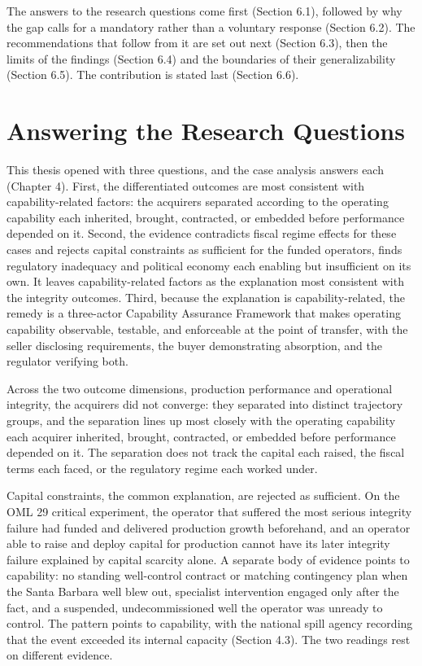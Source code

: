 \documentclass[twoside,fontset=lmodern]{mitthesis}
\begin{document}
The answers to the research questions come first (Section 6.1), followed
by why the gap calls for a mandatory rather than a voluntary response
(Section 6.2). The recommendations that follow from it are set out next
(Section 6.3), then the limits of the findings (Section 6.4) and the
boundaries of their generalizability (Section 6.5). The contribution is
stated last (Section 6.6).

\hypertarget{answering-the-research-questions}{%
\section{Answering the Research
Questions}\label{answering-the-research-questions}}

This thesis opened with three questions, and the case analysis answers
each (Chapter 4). First, the differentiated outcomes are most consistent
with capability-related factors: the acquirers separated according to
the operating capability each inherited, brought, contracted, or
embedded before performance depended on it. Second, the evidence
contradicts fiscal regime effects for these cases and rejects capital
constraints as sufficient for the funded operators, finds regulatory
inadequacy and political economy each enabling but insufficient on its
own. It leaves capability-related factors as the explanation most
consistent with the integrity outcomes. Third, because the explanation
is capability-related, the remedy is a three-actor Capability Assurance
Framework that makes operating capability observable, testable, and
enforceable at the point of transfer, with the seller disclosing
requirements, the buyer demonstrating absorption, and the regulator
verifying both.

Across the two outcome dimensions, production performance and
operational integrity, the acquirers did not converge: they separated
into distinct trajectory groups, and the separation lines up most
closely with the operating capability each acquirer inherited, brought,
contracted, or embedded before performance depended on it. The
separation does not track the capital each raised, the fiscal terms each
faced, or the regulatory regime each worked under.

Capital constraints, the common explanation, are rejected as sufficient.
On the OML 29 critical experiment, the operator that suffered the most
serious integrity failure had funded and delivered production growth
beforehand, and an operator able to raise and deploy capital for
production cannot have its later integrity failure explained by capital
scarcity alone. A separate body of evidence points to capability: no
standing well-control contract or matching contingency plan when the
Santa Barbara well blew out, specialist intervention engaged only after
the fact, and a suspended, undecommissioned well the operator was
unready to control. The pattern points to capability, with the national
spill agency recording that the event exceeded its internal capacity
(Section 4.3). The two readings rest on different evidence.
\end{document}

